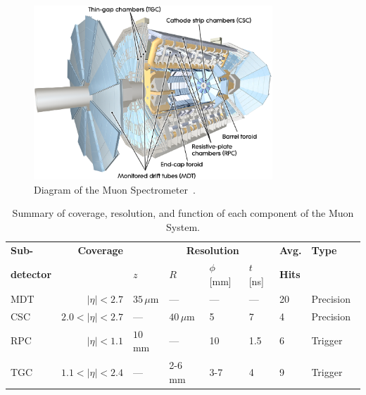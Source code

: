 \begin{figure}[htbp]
\begin{center}
\includegraphics[width=0.8\textwidth]{figures/ATLAS/muon_layout}
\caption[Layout of Muon Spectrometer]{Diagram of the Muon Spectrometer~\cite{ATLAS}.}
\label{fig:mu_layout}
\end{center}
\end{figure}

\begin{table}[htbp]
\begin{center}
\begin{tabular}{lr|llll|ll}
\hline
\textbf{Sub-} &\textbf{Coverage} &\multicolumn{3}{r}{\textbf{Resolution}}&& \textbf{Avg.}&  \textbf{Type}\\
\textbf{detector}& & $z$ & $R$ & $\phi$ [mm] & $t$ [ns]& \textbf{Hits}&\\\hline\hline
MDT & $|\eta|<2.7$          & $35\,\mu$m & --- & --- &---& 20 & Precision \\
CSC & $2.0<|\eta|<2.7$   & --- & $40\,\mu$m & 5 & 7 & 4 & Precision \\
RPC & $|\eta|<1.1$        & $10$\,mm & --- & 10 & 1.5 & 6 & Trigger \\
TGC & $1.1<|\eta|<2.4$ & --- & 2-6 mm & 3-7 & 4 & 9 & Trigger \\
\hline
\end{tabular}
\caption[Coverage and performance of the muon system]{Summary of coverage, resolution, and function of each component of the Muon System.}
\label{tab:muon_cov}
\end{center}
\end{table}

%
